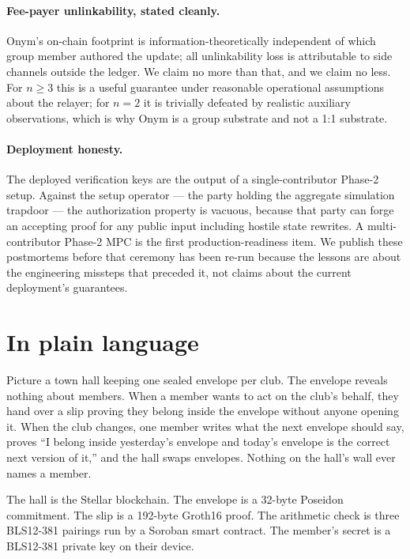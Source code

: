 \documentclass[11pt,a4paper]{article}
\begin{document}
\paragraph{Fee-payer unlinkability, stated cleanly.}
Onym's on-chain footprint is information-theoretically independent of which group member authored the update; all unlinkability loss is attributable to side channels outside the ledger. We claim no more than that, and we claim no less. For $n \geq 3$ this is a useful guarantee under reasonable operational assumptions about the relayer; for $n = 2$ it is trivially defeated by realistic auxiliary observations, which is why Onym is a group substrate and not a 1:1 substrate.

\paragraph{Deployment honesty.}
The deployed verification keys are the output of a single-contributor Phase-2 setup. Against the setup operator --- the party holding the aggregate simulation trapdoor --- the authorization property is vacuous, because that party can forge an accepting proof for any public input including hostile state rewrites. A multi-contributor Phase-2 MPC is the first production-readiness item. We publish these postmortems before that ceremony has been re-run because the lessons are about the engineering missteps that preceded it, not claims about the current deployment's guarantees.

\section{In plain language}

Picture a town hall keeping one sealed envelope per club. The envelope reveals nothing about members. When a member wants to act on the club's behalf, they hand over a slip proving they belong inside the envelope without anyone opening it. When the club changes, one member writes what the next envelope should say, proves ``I belong inside yesterday's envelope and today's envelope is the correct next version of it,'' and the hall swaps envelopes. Nothing on the hall's wall ever names a member.

The hall is the Stellar blockchain. The envelope is a 32-byte Poseidon commitment. The slip is a 192-byte Groth16 proof. The arithmetic check is three BLS12-381 pairings run by a Soroban smart contract. The member's secret is a BLS12-381 private key on their device.
\end{document}
